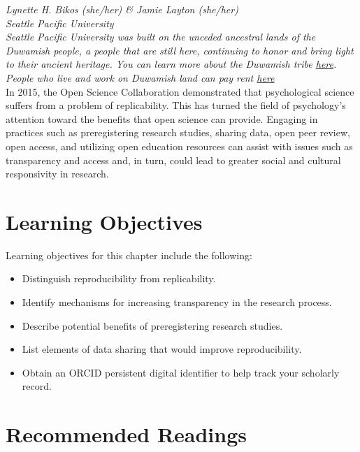 \documentclass[
  11pt,
]{book}
\providecommand{\tightlist}{%
  \setlength{\itemsep}{0pt}\setlength{\parskip}{0pt}}
\begin{document}
\emph{Lynette H. Bikos (she/her) \& Jamie Layton (she/her)}\\
\emph{Seattle Pacific University}\\
\emph{Seattle Pacific University was built on the unceded ancestral lands of the Duwamish people, a people that are still here, continuing to honor and bring light to their ancient heritage. You can learn more about the Duwamish tribe \href{https://www.duwamishtribe.org/}{here}. People who live and work on Duwamish land can pay rent \href{https://www.realrentduwamish.org/}{here}}\\

In 2015, the Open Science Collaboration demonstrated that psychological science suffers from a problem of replicability. This has turned the field of psychology's attention toward the benefits that open science can provide. Engaging in practices such as preregistering research studies, sharing data, open peer review, open access, and utilizing open education resources can assist with issues such as transparency and access and, in turn, could lead to greater social and cultural responsivity in research.

\hypertarget{learning-objectives-2}{%
\section{Learning Objectives}\label{learning-objectives-2}}

Learning objectives for this chapter include the following:

\begin{itemize}
\tightlist
\item
  Distinguish reproducibility from replicability.
\item
  Identify mechanisms for increasing transparency in the research process.
\item
  Describe potential benefits of preregistering research studies.
\item
  List elements of data sharing that would improve reproducibility.
\item
  Obtain an ORCID persistent digital identifier to help track your scholarly record.
\end{itemize}

\hypertarget{recommended-readings-1}{%
\section{Recommended Readings}\label{recommended-readings-1}}
\end{document}

